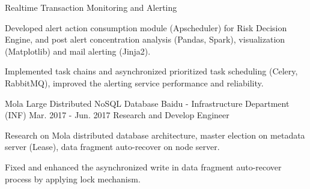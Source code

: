 \documentclass[11pt, a4paper, UTF8]{awesome-cv}
\begin{document}
\begin{cventries}
  \cventry
    {Realtime Transaction Monitoring and Alerting} %
    {} %
    {} %
    {\ } %
    {
      \begin{cvitems} %
        \item {Developed alert action consumption module (Apscheduler) for Risk Decision Engine, and post alert concentration analysis (Pandas, Spark), visualization (Matplotlib) and mail alerting (Jinja2).}
        \item {Implemented task chains and asynchronized prioritized task scheduling (Celery, RabbitMQ), improved the alerting service performance and reliability.}
      \end{cvitems}
    }
    
  \cventry
    {Mola Large Distributed NoSQL Database} %
    {Baidu -  Infrastructure Department (INF)} %
    {Mar. 2017 - Jun. 2017} %
    {Research and Develop Engineer} %
    {
      \begin{cvitems} %
        \item {Research on Mola distributed database architecture, master election on metadata server (Lease), data fragment auto-recover on node server.}
        \item {Fixed and enhanced the asynchronized write in data fragment auto-recover process by applying lock mechanism.}
      \end{cvitems}
    }


\end{cventries}
\end{document}
